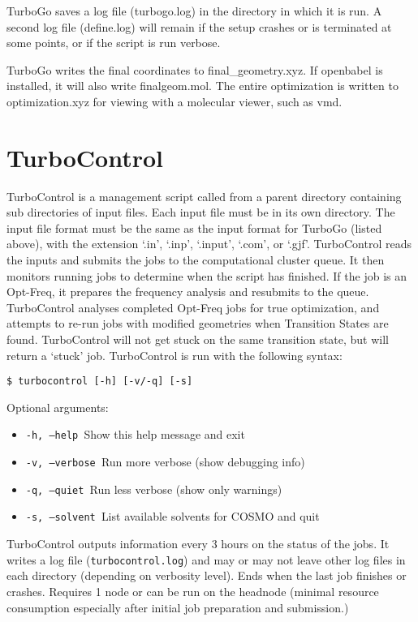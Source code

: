 TurboGo saves a log file (turbogo.log) in the directory in which it is run. A second log file (define.log) will remain if the setup crashes or is terminated at some points, or if the script is run verbose.

TurboGo writes the final coordinates to final\_geometry.xyz. If openbabel is installed, it will also write finalgeom.mol. The entire optimization is written to optimization.xyz for viewing with a molecular viewer, such as vmd.

\section{TurboControl}

TurboControl is a management script called from a parent directory containing sub directories of input files. Each input file must be in its own directory. The input file format must be the same as the input format for TurboGo (listed above), with the extension `.in', `.inp', `.input', `.com', or `.gjf'. TurboControl reads the inputs and submits the jobs to the computational cluster queue. It then monitors running jobs to determine when the script has finished. If the job is an Opt-Freq, it prepares the frequency analysis and resubmits to the queue. TurboControl analyses completed Opt-Freq jobs for true optimization, and attempts to re-run jobs with modified geometries when Transition States are found. TurboControl will not get stuck on the same transition state, but will return a `stuck' job. TurboControl is run with the following syntax:

\begin{center}
\begin{verbatim}
$ turbocontrol [-h] [-v/-q] [-s]
\end{verbatim}
\end{center}

Optional arguments:

\begin{itemize}
\item \texttt{-h, --help            }Show this help message and exit
\item \texttt{-v, --verbose         }Run more verbose (show debugging info)
\item \texttt{-q, --quiet           }Run less verbose (show only warnings)
\item \texttt{-s, --solvent         }List available solvents for COSMO and quit
\end{itemize}

TurboControl outputs information every 3 hours on the status of the jobs. It writes a log file (\texttt{turbocontrol.log}) and may or may not leave other log files in each directory (depending on verbosity level). Ends when the last job finishes or crashes. Requires 1 node or can be run on the headnode (minimal resource consumption especially after initial job preparation and submission.)

